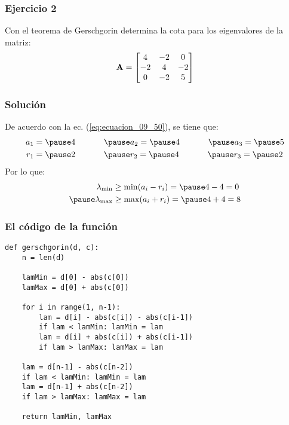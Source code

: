 \documentclass[12pt]{beamer}
\begin{document}
\begin{frame}
\frametitle{Ejercicio 2}
Con el teorema de Gerschgorin determina la cota para los eigenvalores de la matriz:
\pause
\begin{align*}
\vb{A} = 
\begin{bmatrix}
4 & -2 & 0 \\
-2 & 4 & -2 \\
0 & -2 & 5
\end{bmatrix}
\end{align*}
\end{frame}
\begin{frame}
\frametitle{Solución}
De acuerdo con la ec. (\ref{eq:ecuacion_09_50}), se tiene que:
\pause
\begin{eqnarray*}
\begin{aligned}
a_{1} &= \pause 4 \hspace{1.2cm} \pause a_{2} = \pause 4 \hspace{1.2cm} \pause a_{3} = \pause 5 \\
r_{1} &= \pause 2 \hspace{1.2cm} \pause r_{2} = \pause 4 \hspace{1.2cm} \pause r_{3} = \pause 2
\end{aligned}
\end{eqnarray*}
\pause
Por lo que:
\pause
\begin{eqnarray*}
\begin{aligned}
\lambda_{\min} &\geq \min (a_{i} - r_{i}) = \pause 4 - 4 = 0 \\ \pause
\lambda_{\max} &\geq \max (a_{i} + r_{i}) = \pause 4 + 4 = 8
\end{aligned}
\end{eqnarray*}
\end{frame}
\begin{frame}
\frametitle{El código de la función}
\begin{lstlisting}[caption=Función para establecer los paréntesis de los eigenvalores]
def gerschgorin(d, c):
    n = len(d)
    
    lamMin = d[0] - abs(c[0])
    lamMax = d[0] + abs(c[0])
    
    for i in range(1, n-1):
        lam = d[i] - abs(c[i]) - abs(c[i-1])
        if lam < lamMin: lamMin = lam
        lam = d[i] + abs(c[i]) + abs(c[i-1])
        if lam > lamMax: lamMax = lam
        
    lam = d[n-1] - abs(c[n-2])
    if lam < lamMin: lamMin = lam
    lam = d[n-1] + abs(c[n-2])
    if lam > lamMax: lamMax = lam
    
    return lamMin, lamMax
\end{lstlisting}
\end{frame}
\end{document}
